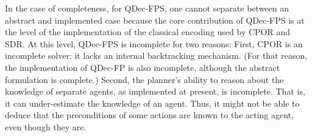 \documentclass[letterpaper]{article} %
\theoremstyle{definition}
\begin{document}
In the case of completeness, for QDec-FPS, one cannot
separate between an abstract and implemented case because the core contribution of QDec-FPS is at the level of
the implementation of the classical encoding used by CPOR and SDR. At this level, QDec-FPS is incomplete for two
reasons: First, CPOR is an incomplete solver: it lacks an internal backtracking mechanism. (For that reason, the implementation of QDec-FP is also incomplete, although the abstract formulation is complete.)
Second, the planner's ability to reason about the knowledge of separate agents, as implemented at present, is incomplete. That is, it can under-estimate the knowledge of an agent. Thus, it might not be able to deduce that the preconditions of some actions are known to the acting agent, even though they are.



\end{document}

